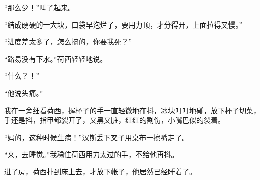 \par “那么少！”叫了起来。
\par “结成硬硬的一大块，口袋早泡烂了，要用力顶，才分得开，上面拉得又慢。”
\par “进度差太多了，怎么搞的，你要我死？”
\par “路易没有下水。”荷西轻轻地说。
\par “什么？！”
\par “他说头痛。”
\par 我在一旁细看荷西，握杯子的手一直轻微地在抖，冰块叮叮地碰，放下杯子切菜，手还是抖，指甲都裂开了，又黑又脏，红红的割伤，小嘴巴似的裂着。
\par “妈的，这种时候生病！”汉斯丢下叉子用桌布一擦嘴走了。
\par “来，去睡觉。”我稳住荷西用力太过的手，不给他再抖。
\par 进了房，荷西扑到床上去，才放下帐子，他居然已经睡着了。



